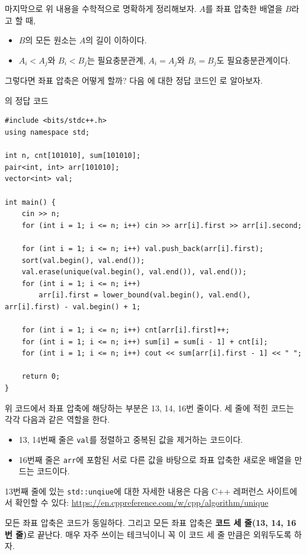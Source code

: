 마지막으로 위 내용을 수학적으로 명확하게 정리해보자. $A$를 좌표 압축한 배열을 $B$라고 할 때, 
\begin{itemize}
    \item $B$의 모든 원소는 $A$의 길이 이하이다.
    \item $A_i < A_j$와 $B_i < B_j$는 필요충분관계, $A_i = A_j$와 $B_i = B_j$도 필요충분관계이다.
\end{itemize}

그렇다면 좌표 압축은 어떻게 할까? 다음 에 대한 정답 코드인 로 알아보자.
\begin{code} \label{code: value-compression}
의 정답 코드
\begin{lstlisting}
#include <bits/stdc++.h>
using namespace std;

int n, cnt[101010], sum[101010];
pair<int, int> arr[101010];
vector<int> val;

int main() {
    cin >> n;
    for (int i = 1; i <= n; i++) cin >> arr[i].first >> arr[i].second;

    for (int i = 1; i <= n; i++) val.push_back(arr[i].first);
    sort(val.begin(), val.end());
    val.erase(unique(val.begin(), val.end()), val.end());
    for (int i = 1; i <= n; i++) 
        arr[i].first = lower_bound(val.begin(), val.end(), arr[i].first) - val.begin() + 1;

    for (int i = 1; i <= n; i++) cnt[arr[i].first]++;
    for (int i = 1; i <= n; i++) sum[i] = sum[i - 1] + cnt[i];
    for (int i = 1; i <= n; i++) cout << sum[arr[i].first - 1] << " ";

    return 0;
}
\end{lstlisting}
\end{code}
위 코드에서 좌표 압축에 해당하는 부분은 13, 14, 16번 줄이다. 세 줄에 적힌 코드는 각각 다음과 같은 역할을 한다.
\begin{itemize}
    \item 13, 14번째 줄은 \texttt{val}를 정렬하고 중복된 값을 제거하는 코드이다.
    \item 16번째 줄은 \texttt{arr}에 포함된 서로 다른 값을 바탕으로 좌표 압축한 새로운 배열을 만드는 코드이다.
\end{itemize}
13번째 줄에 있는 \texttt{std::unqiue}에 대한 자세한 내용은 다음 C++ 레퍼런스 사이트에서 확인할 수 있다: \url{https://en.cppreference.com/w/cpp/algorithm/unique}

모든 좌표 압축은 코드가 동일하다. 그리고 모든 좌표 압축은 \textbf{코드 세 줄(13, 14, 16번 줄)}로 끝난다. 매우 자주 쓰이는 테크닉이니 꼭 이 코드 세 줄 만큼은 외워두도록 하자.

